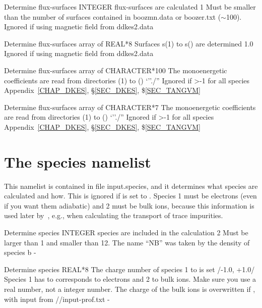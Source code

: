 {Determine flux-surfaces}
{INTEGER}
{ flux-surfaces are calculated}
{1}%
{Must be smaller than the number of surfaces contained in {\ttfamily boozmn.data} or {\ttfamily boozer.txt} ($\sim$100). Ignored if using magnetic field from {\ttfamily ddkes2.data}}
{}

{Determine flux-surfaces}
{array of REAL*8}
{Surfaces s(1) to s() are determined}
{1.0}%
{Ignored if using magnetic field from {\ttfamily ddkes2.data}}
{}

{Determine flux-surfaces}
{array of CHARACTER*100}
{The monoenergetic coefficients are read from directories (1) to ()}
{`''./''}
{Ignored if >-1 for all species}
{Appendix~\ref{CHAP_DKES}, \S\ref{SEC_DKES}, \$\ref{SEC_TANGVM}}
  
{Determine flux-surfaces}
{array of CHARACTER*7}
{The monoenergetic coefficients are read from directories (1) to ()}
{`''./''}
{Ignored if >-1 for all species}
{Appendix~\ref{CHAP_DKES}, \S\ref{SEC_DKES}, \$\ref{SEC_TANGVM}}



\section{The {\ttfamily species} namelist}\label{SEC_SPE}

This namelist is contained in file {\ttfamily input.species}, and it determines what species are calculated and how. This is ignored if  is set to \true. Species 1 must be electrons (even if you want them adiabatic) and 2 must be bulk ions, because this information is used later by~\KNOSOS, e.g., when calculating the transport of trace impurities. 
 

{Determine species}
{INTEGER}
{ species are included in the calculation}
{2}%
{Must be larger than 1 and smaller than 12. The name ``NB'' was taken by the density of species b}
{-}

{Determine species}
{REAL*8}
{The charge number of species 1 to  is set}
{/-1.0, +1.0/}%
{Species 1 has to corresponds to electrons and 2 to bulk ions. Make sure you use a real number, not a integer number. The charge of the bulk ions is overwritten if , with input from {\ttfamily //input-prof.txt}}
{-}

